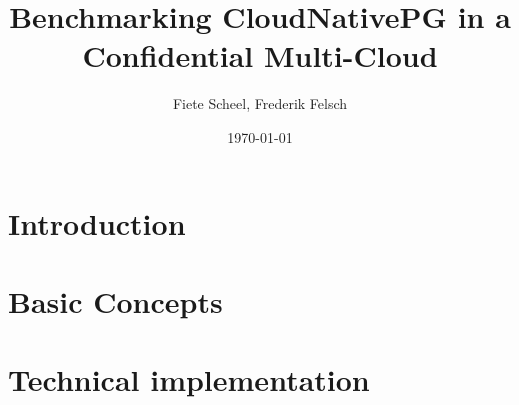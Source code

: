 \documentclass[a4paper, ngerman, 12pt]{scrreprt}
\begin{document}
\title{Benchmarking CloudNativePG in a Confidential Multi-Cloud} %
\author{Fiete Scheel, Frederik Felsch} %
\date{\today} %

\maketitle

\tableofcontents
\newpage

\chapter{Introduction}


\chapter{Basic Concepts}


\chapter{Technical implementation}


\printbibliography


\end{document}
